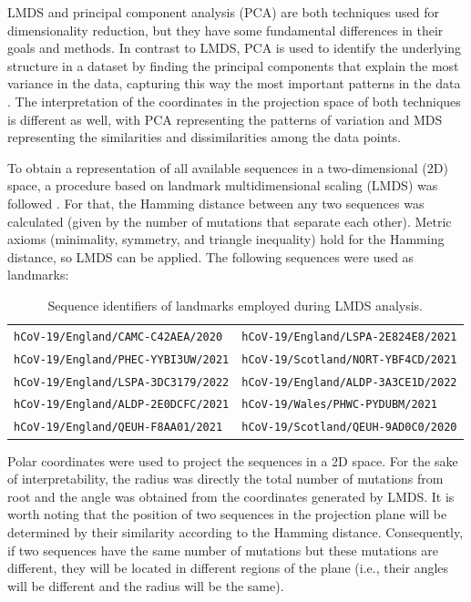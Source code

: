 LMDS and principal component analysis (PCA) are both techniques used for dimensionality reduction, but they have some fundamental differences in their goals and methods. In contrast to LMDS, PCA is used to identify the underlying structure in a dataset by finding the principal components that explain the most variance in the data, capturing this way the most important patterns in the data \cite{jolliffe2016}. The interpretation of the coordinates in the projection space of both techniques is different as well, with PCA representing the patterns of variation and MDS representing the similarities and dissimilarities among the data points.

To obtain a representation of all available sequences in a two-dimensional (2D) space, a procedure based on landmark multidimensional scaling (LMDS) was followed \cite{deSilva2003}. For that, the Hamming distance between any two sequences was calculated (given by the number of mutations that separate each other). Metric axioms (minimality, symmetry, and triangle inequality) hold for the Hamming distance, so LMDS can be applied. The following sequences were used as landmarks:

\begin{table}[ht!]
    \centering
    \begin{tabular}{|l|l|}
        \hline
        \small\texttt{hCoV-19/England/CAMC-C42AEA/2020} & \small\texttt{hCoV-19/England/LSPA-2E824E8/2021}\\
        \small\texttt{hCoV-19/England/PHEC-YYBI3UW/2021} & \small\texttt{hCoV-19/Scotland/NORT-YBF4CD/2021}\\
        \small\texttt{hCoV-19/England/LSPA-3DC3179/2022} & \small\texttt{hCoV-19/England/ALDP-3A3CE1D/2022}\\
        \small\texttt{hCoV-19/England/ALDP-2E0DCFC/2021} & \small\texttt{hCoV-19/Wales/PHWC-PYDUBM/2021}\\
        \small\texttt{hCoV-19/England/QEUH-F8AA01/2021} & \small\texttt{hCoV-19/Scotland/QEUH-9AD0C0/2020}\\
        \hline
    \end{tabular}
    \caption{Sequence identifiers of landmarks employed during LMDS analysis.}
\end{table}

Polar coordinates were used to project the sequences in a 2D space. For the sake of interpretability, the radius was directly the total number of mutations from root and the angle was obtained from the coordinates generated by LMDS. It is worth noting that the position of two sequences in the projection plane will be determined by their similarity according to the Hamming distance. Consequently, if two sequences have the same number of mutations but these mutations are different, they will be located in different regions of the plane (i.e., their angles will be different and the radius will be the same).


